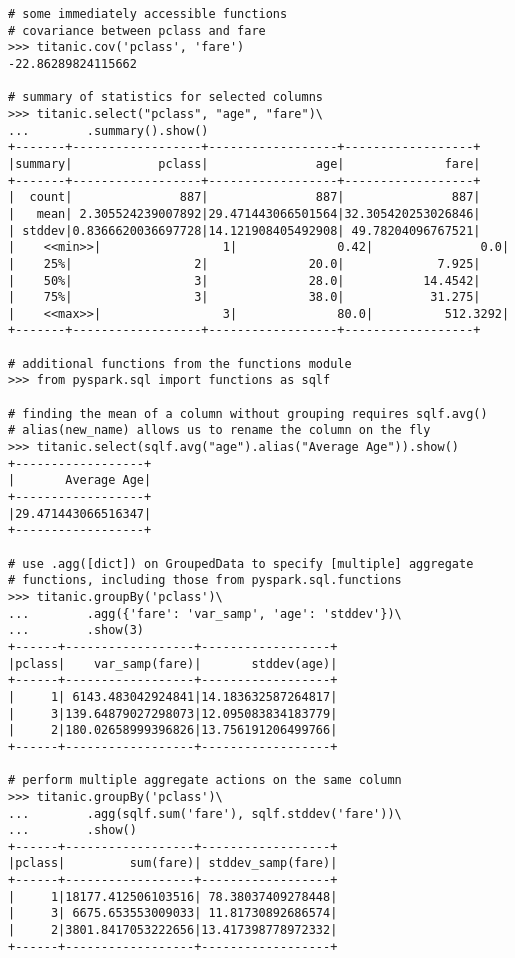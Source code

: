 \begin{lstlisting}
# some immediately accessible functions
# covariance between pclass and fare
>>> titanic.cov('pclass', 'fare')
-22.86289824115662

# summary of statistics for selected columns
>>> titanic.select("pclass", "age", "fare")\
...		   .summary().show()
+-------+------------------+------------------+------------------+
|summary|            pclass|               age|              fare|
+-------+------------------+------------------+------------------+
|  count|               887|               887|               887|
|   mean| 2.305524239007892|29.471443066501564|32.305420253026846|
| stddev|0.8366620036697728|14.121908405492908| 49.78204096767521|
|    <<min>>|                 1|              0.42|               0.0|
|    25%|                 2|              20.0|             7.925|
|    50%|                 3|              28.0|           14.4542|
|    75%|                 3|              38.0|            31.275|
|    <<max>>|                 3|              80.0|          512.3292|
+-------+------------------+------------------+------------------+

# additional functions from the functions module
>>> from pyspark.sql import functions as sqlf

# finding the mean of a column without grouping requires sqlf.avg()
# alias(new_name) allows us to rename the column on the fly
>>> titanic.select(sqlf.avg("age").alias("Average Age")).show() 
+------------------+
|       Average Age|
+------------------+
|29.471443066516347|
+------------------+

# use .agg([dict]) on GroupedData to specify [multiple] aggregate
# functions, including those from pyspark.sql.functions
>>> titanic.groupBy('pclass')\
...        .agg({'fare': 'var_samp', 'age': 'stddev'})\
...        .show(3)
+------+------------------+------------------+
|pclass|    var_samp(fare)|       stddev(age)|
+------+------------------+------------------+
|     1| 6143.483042924841|14.183632587264817|
|     3|139.64879027298073|12.095083834183779|
|     2|180.02658999396826|13.756191206499766|
+------+------------------+------------------+

# perform multiple aggregate actions on the same column
>>> titanic.groupBy('pclass')\
...        .agg(sqlf.sum('fare'), sqlf.stddev('fare'))\
...        .show()
+------+------------------+------------------+
|pclass|         sum(fare)| stddev_samp(fare)|
+------+------------------+------------------+
|     1|18177.412506103516| 78.38037409278448|
|     3| 6675.653553009033| 11.81730892686574|
|     2|3801.8417053222656|13.417398778972332|
+------+------------------+------------------+

\end{lstlisting}

